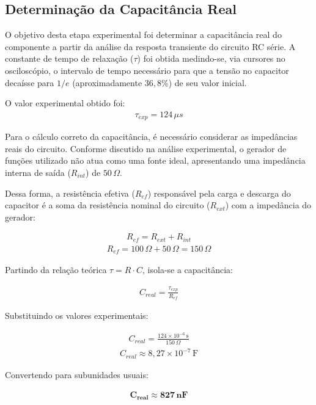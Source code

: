 \subsection{Determinação da Capacitância Real}
O objetivo desta etapa experimental foi determinar a capacitância real do componente a partir da análise da resposta transiente do circuito RC série. A constante de tempo de relaxação ($\tau$) foi obtida medindo-se, via cursores no osciloscópio, o intervalo de tempo necessário para que a tensão no capacitor decaísse para $1/e$ (aproximadamente $36,8\%$) de seu valor inicial.

O valor experimental obtido foi:
\begin{align*}
	\tau_{exp} = 124 \, \mu s
\end{align*}

Para o cálculo correto da capacitância, é necessário considerar as impedâncias reais do circuito. Conforme discutido na análise experimental, o gerador de funções utilizado não atua como uma fonte ideal, apresentando uma impedância interna de saída ($R_{int}$) de $50 \, \Omega$.

Dessa forma, a resistência efetiva ($R_{ef}$) responsável pela carga e descarga do  capacitor é a soma da resistência nominal do circuito ($R_{ext}$) com a impedância do gerador:

\begin{align*}
	R_{ef} = R_{ext} + R_{int}
\end{align*}
\begin{align*}
	R_{ef} = 100 \, \Omega + 50 \, \Omega = 150 \, \Omega
\end{align*}

Partindo da relação teórica $\tau = R \cdot C$, isola-se a capacitância:

\begin{align*}
	C_{real} = \frac{\tau_{exp}}{R_{ef}}
\end{align*}

Substituindo os valores experimentais:

\begin{align*}
	C_{real} = \frac{124 \times 10^{-6} \, \text{s}}{150 \, \Omega} 
\end{align*}
\begin{align*}  
	C_{real} \approx 8,27 \times 10^{-7} \, \text{F}
\end{align*}


Convertendo para subunidades usuais:

\begin{align*}
	\mathbf{C_{real} \approx 827 \, \text{nF}}
\end{align*}

